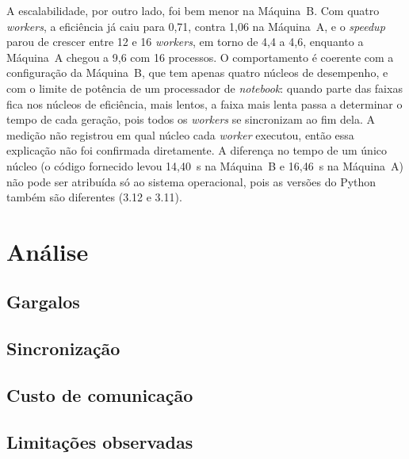 A escalabilidade, por outro lado, foi bem menor na Máquina~B. Com quatro \textit{workers}, a eficiência já caiu para 0,71, contra 1,06 na Máquina~A, e o \textit{speedup} parou de crescer entre 12 e 16 \textit{workers}, em torno de 4,4 a 4,6, enquanto a Máquina~A chegou a 9,6 com 16 processos. O comportamento é coerente com a configuração da Máquina~B, que tem apenas quatro núcleos de desempenho, e com o limite de potência de um processador de \textit{notebook}: quando parte das faixas fica nos núcleos de eficiência, mais lentos, a faixa mais lenta passa a determinar o tempo de cada geração, pois todos os \textit{workers} se sincronizam ao fim dela. A medição não registrou em qual núcleo cada \textit{worker} executou, então essa explicação não foi confirmada diretamente. A diferença no tempo de um único núcleo (o código fornecido levou 14,40~s na Máquina~B e 16,46~s na Máquina~A) não pode ser atribuída só ao sistema operacional, pois as versões do Python também são diferentes (3.12 e 3.11).

\section{Análise}

\subsection{Gargalos}
\todo{}

\subsection{Sincronização}
\todo{}

\subsection{Custo de comunicação}
\todo{}

\subsection{Limitações observadas}
\todo{}
